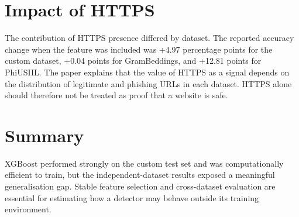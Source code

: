 \section{Impact of HTTPS}
The contribution of HTTPS presence differed by dataset. The reported accuracy change when the feature was included was +4.97 percentage points for the custom dataset, +0.04 points for GramBeddings, and +12.81 points for PhiUSIIL. The paper explains that the value of HTTPS as a signal depends on the distribution of legitimate and phishing URLs in each dataset. HTTPS alone should therefore not be treated as proof that a website is safe.\cite{bib1}

\section{Summary}
XGBoost performed strongly on the custom test set and was computationally efficient to train, but the independent-dataset results exposed a meaningful generalisation gap. Stable feature selection and cross-dataset evaluation are essential for estimating how a detector may behave outside its training environment.
